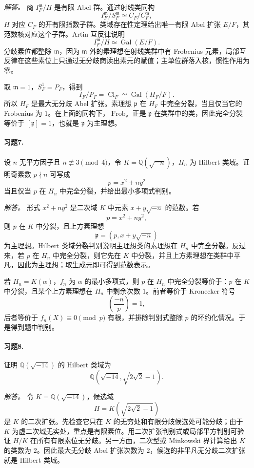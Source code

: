 \documentclass[11pt,a4paper,openany]{ctexbook}
\numberwithin{equation}{chapter}
\newcommand{\Q}{\mathbb{Q}}
\newcommand{\Gal}{\operatorname{Gal}}
\newcommand{\Cl}{\operatorname{Cl}}
\newcommand{\Frob}{\operatorname{Frob}}
\theoremstyle{plain}
\theoremstyle{definition}
\theoremstyle{remark}
\begin{document}
\emph{解答。}
商 $I_F^\mathfrak m/H$ 是有限 Abel 群。通过射线类同构
\[
I_F^\mathfrak m/S_F^\mathfrak m\simeq C_F/C_F^\mathfrak m,
\]
$H$ 对应 $C_F$ 的开有限指数子群。类域存在性定理给出唯一有限 Abel 扩张 $E/F$，其范数核对应这个子群。Artin 互反律说明
\[
I_F^\mathfrak m/H\simeq\Gal(E/F).
\]
分歧素位都整除 $\mathfrak m$，因为 $\mathfrak m$ 外的素理想在射线类群中有 Frobenius 元素，局部互反律在这些素位上只通过无分歧商读出素元的赋值；主单位群落入核，惯性作用为零。

取 $\mathfrak m=1$，$S_F^1=P_F$，得到
\[
I_F/P_F=\Cl_F\simeq\Gal(H_F/F).
\]
所以 $H_F$ 是最大无分歧 Abel 扩张。素理想 $\mathfrak p$ 在 $H_F$ 中完全分裂，当且仅当它的 Frobenius 为 $1$。在上面的同构下，$\Frob_\mathfrak p$ 正是 $\mathfrak p$ 在类群中的类，因此完全分裂等价于 $[\mathfrak p]=1$，也就是 $\mathfrak p$ 为主理想。

\paragraph{习题7.}
设 $n$ 无平方因子且 $n\not\equiv3\pmod4$，令 $K=\Q(\sqrt{-n})$，$H_n$ 为 Hilbert 类域。证明奇素数 $p\nmid n$ 可写成
\[
p=x^2+ny^2
\]
当且仅当 $p$ 在 $H_n$ 中完全分裂，并给出最小多项式判别。

\emph{解答。}
形式 $x^2+ny^2$ 是二次域 $K$ 中元素 $x+y\sqrt{-n}$ 的范数。若
\[
p=x^2+ny^2,
\]
则 $p$ 在 $K$ 中分裂，且上方素理想
\[
\mathfrak p=(p,x+y\sqrt{-n})
\]
为主理想。Hilbert 类域分裂判别说明主理想类的素理想在 $H_n$ 中完全分裂。反过来，若 $p$ 在 $H_n$ 中完全分裂，则它先在 $K$ 中分裂，并且上方素理想在类群中平凡，因此为主理想；取生成元即可得到范数表示。

若 $H_n=K(\alpha)$，$f_n$ 为 $\alpha$ 的最小多项式，则 $p$ 在 $H_n$ 中完全分裂等价于：$p$ 在 $K$ 中分裂，且某个上方素理想在 $H_n$ 中剩余次数 $1$。前者等价于 Kronecker 符号
\[
\left(\frac{-n}{p}\right)=1,
\]
后者等价于 $f_n(X)\equiv0\pmod p$ 有根，并排除判别式整除 $p$ 的坏约化情况。于是得到题中判别。

\paragraph{习题8.}
证明 $\Q(\sqrt{-14})$ 的 Hilbert 类域为
\[
\Q(\sqrt{-14},\sqrt{2\sqrt2-1}).
\]

\emph{解答。}
令 $K=\Q(\sqrt{-14})$，候选域
\[
H=K(\sqrt{2\sqrt2-1})
\]
是 $K$ 的二次扩张。先检查它只在 $K$ 的无穷处和有限分歧候选处可能分歧；由于 $K$ 为虚二次域无实处，重点是有限素位。用二次扩张判别式或局部平方判别可验证 $H/K$ 在所有有限素位无分歧。另一方面，二次型或 Minkowski 界计算给出 $K$ 的类数为 $2$。因此最大无分歧 Abel 扩张次数为 $2$，候选的非平凡无分歧二次扩张就是 Hilbert 类域。
\end{document}
